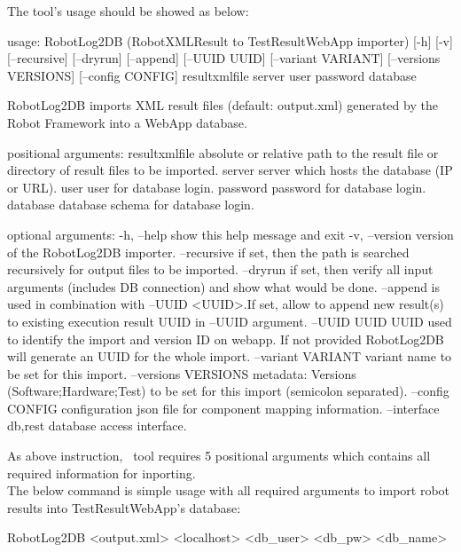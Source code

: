     The tool's usage should be showed as below:
\begin{robotlog}
usage: RobotLog2DB (RobotXMLResult to TestResultWebApp importer) [-h] [-v]
                    [--recursive] [--dryrun] [--append] [--UUID UUID]
                    [--variant VARIANT] [--versions VERSIONS] [--config CONFIG]
                    resultxmlfile server user password database

RobotLog2DB imports XML result files (default: output.xml) generated by the
                     Robot Framework into a WebApp database.

positional arguments:
resultxmlfile        absolute or relative path to the result file or directory
                     of result files to be imported.
server               server which hosts the database (IP or URL).
user                 user for database login.
password             password for database login.
database             database schema for database login.

optional arguments:
-h, --help           show this help message and exit
-v, --version        version of the RobotLog2DB importer.
--recursive          if set, then the path is searched recursively for output
                     files to be imported.
--dryrun             if set, then verify all input arguments (includes DB
                     connection) and show what would be done.
--append             is used in combination with --UUID <UUID>.If set, allow to
                     append new result(s) to existing execution result UUID in
                     --UUID argument.
--UUID UUID          UUID used to identify the import and version ID on webapp.
                     If not provided RobotLog2DB will generate an UUID for the
                     whole import.
--variant VARIANT    variant name to be set for this import.
--versions VERSIONS  metadata: Versions (Software;Hardware;Test) to be set for
                     this import (semicolon separated).
--config CONFIG      configuration json file for component mapping information.
--interface {db,rest} 
                     database access interface.
\end{robotlog}

    As above instruction, \pkg\ tool requires 5 positional arguments which
    contains all required information for inporting.\\
    The below command is simple usage with all required arguments to import
    robot results into TestResultWebApp's database:
\begin{robotlog}
RobotLog2DB <output.xml> <localhost> <db\_user> <db\_pw> <db\_name>
\end{robotlog}

